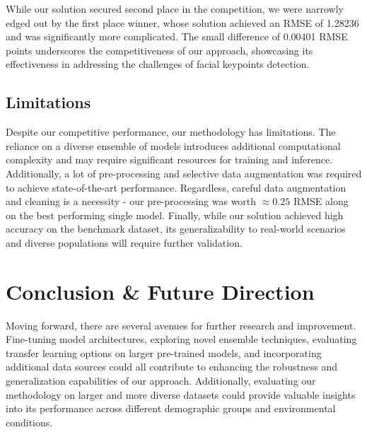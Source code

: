 While our solution secured second place in the competition, we were narrowly edged out by the first place winner, whose solution achieved an RMSE of 1.28236 and was significantly more complicated. The small difference of 0.00401 RMSE points underscores the competitiveness of our approach, showcasing its effectiveness in addressing the challenges of facial keypoints detection.

\subsection{Limitations}

Despite our competitive performance, our methodology has limitations. The reliance on a diverse ensemble of models introduces additional computational complexity and may require significant resources for training and inference. Additionally, a lot of pre-processing and selective data augmentation was required to achieve state-of-the-art performance.  Regardless, careful data augmentation and cleaning is a necessity - our pre-processing was worth $\approx 0.25$ RMSE along on the best performing single model.  Finally, while our solution achieved high accuracy on the benchmark dataset, its generalizability to real-world scenarios and diverse populations will require further validation.

\section{Conclusion \& Future Direction}

Moving forward, there are several avenues for further research and improvement. Fine-tuning model architectures, exploring novel ensemble techniques, evaluating transfer learning options on larger pre-trained models, and incorporating additional data sources could all contribute to enhancing the robustness and generalization capabilities of our approach. Additionally, evaluating our methodology on larger and more diverse datasets could provide valuable insights into its performance across different demographic groups and environmental conditions.